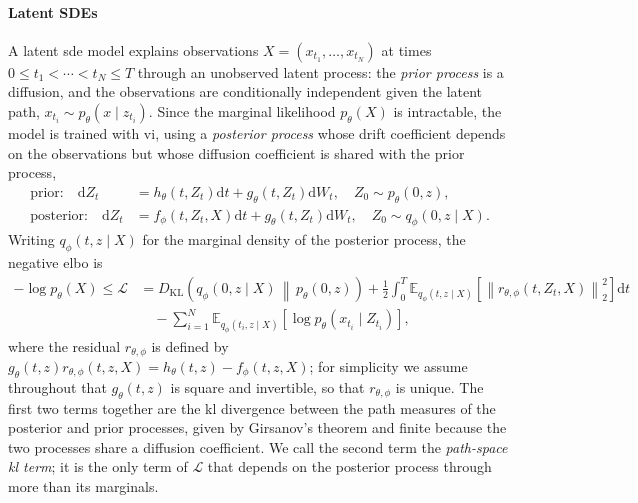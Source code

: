 \documentclass{article} %
\newcommand{\priordrift}{h}
\newcommand{\postdrift}{f}
\newcommand{\vol}{g}
\newcommand{\obs}{X}
\newcommand{\KL}[2]{D_{\mathrm{KL}}\left(#1 \,\middle\|\, #2\right)}
\newcommand{\E}{\mathbb{E}}
\newcommand{\loss}{\mathcal{L}}
\newcommand{\diff}{{\mathrm{d}}}
\begin{document}
\paragraph{Latent SDEs}
A latent \gls{sde} model explains observations $\obs = (x_{t_1}, \ldots, x_{t_N})$ at times $0 \le t_1 < \cdots < t_N \le T$ through an unobserved latent process: the \emph{prior process} is a diffusion, and the observations are conditionally independent given the latent path, $x_{t_i} \sim p_\theta(x \mid z_{t_i})$. Since the marginal likelihood $p_\theta(\obs)$ is intractable, the model is trained with \gls{vi}, using a \emph{posterior process} whose drift coefficient depends on the observations but whose diffusion coefficient is shared with the prior process,
\begin{align}
    \text{prior:}\quad \diff Z_t &= \priordrift_\theta(t, Z_t) \diff t + \vol_\theta(t, Z_t) \diff W_t, \quad Z_0 \sim p_\theta(0, z), \label{eq:prior} \\
    \text{posterior:}\quad \diff Z_t &= \postdrift_\phi(t, Z_t, \obs) \diff t + \vol_\theta(t, Z_t) \diff W_t, \quad Z_0 \sim q_\phi(0, z \mid \obs). \label{eq:posterior}
\end{align}
Writing $q_\phi(t, z \mid \obs)$ for the marginal density of the posterior process, the negative \gls{elbo} is
\begin{align}
    -\log p_\theta(\obs) \le \loss &= \KL{q_\phi(0, z \mid \obs)}{p_\theta(0, z)} + \frac{1}{2} \int_0^T \E_{q_\phi(t, z \mid \obs)} \left[ \left\| r_{\theta, \phi}(t, Z_t, \obs) \right\|_2^2 \right] \diff t \nonumber \\
    &\quad - \sum_{i=1}^N \E_{q_\phi(t_i, z \mid \obs)} \left[ \log p_\theta(x_{t_i} \mid Z_{t_i}) \right], \label{eq:elbo}
\end{align}
where the residual $r_{\theta, \phi}$ is defined by $\vol_\theta(t, z) r_{\theta, \phi}(t, z, \obs) = \priordrift_\theta(t, z) - \postdrift_\phi(t, z, \obs)$; for simplicity we assume throughout that $\vol_\theta(t, z)$ is square and invertible, so that $r_{\theta, \phi}$ is unique. The first two terms together are the \gls{kl} divergence between the path measures of the posterior and prior processes, given by Girsanov's theorem \citep{oksendal2003stochastic} and finite because the two processes share a diffusion coefficient. We call the second term the \emph{path-space \gls{kl} term}; it is the only term of $\loss$ that depends on the posterior process through more than its marginals.
\end{document}

